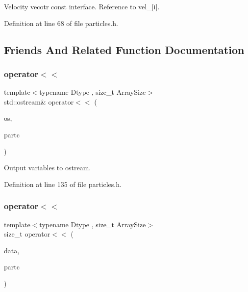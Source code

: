 Velocity vecotr const interface. Reference to vel\+\_\+\mbox{[}i\mbox{]}. 



Definition at line 68 of file particles.\+h.



\subsection{Friends And Related Function Documentation}
\mbox{\label{class_vel_indep_particles_afdcedfff1e424d7973f15783cc3f05cf}} 
\subsubsection{\texorpdfstring{operator$<$$<$}{operator<<}\hspace{0.1cm}{\footnotesize\ttfamily [1/2]}}
{\footnotesize\ttfamily template$<$typename Dtype , size\+\_\+t Array\+Size$>$ \\
std\+::ostream\& operator$<$$<$ (\begin{DoxyParamCaption}\item[{std\+::ostream \&}]{os,  }\item[{const \mbox{\hyperlink{class_vel_indep_particles}{Vel\+Indep\+Particles}}$<$ Dtype, Array\+Size $>$ \&}]{partc }\end{DoxyParamCaption})\hspace{0.3cm}{\ttfamily [friend]}}



Output variables to ostream. 



Definition at line 135 of file particles.\+h.

\mbox{\label{class_vel_indep_particles_a0aabea652baadd76eec861b55d2b0857}} 
\subsubsection{\texorpdfstring{operator$<$$<$}{operator<<}\hspace{0.1cm}{\footnotesize\ttfamily [2/2]}}
{\footnotesize\ttfamily template$<$typename Dtype , size\+\_\+t Array\+Size$>$ \\
size\+\_\+t operator$<$$<$ (\begin{DoxyParamCaption}\item[{\mbox{\hyperlink{class_vel_indep_particles_a6bba8ac3f941a144214037a27ccaa119}{Dyn\+Scalar\+Array}} \&}]{data,  }\item[{const \mbox{\hyperlink{class_vel_indep_particles}{Vel\+Indep\+Particles}}$<$ Dtype, Array\+Size $>$ \&}]{partc }\end{DoxyParamCaption})\hspace{0.3cm}{\ttfamily [friend]}}



